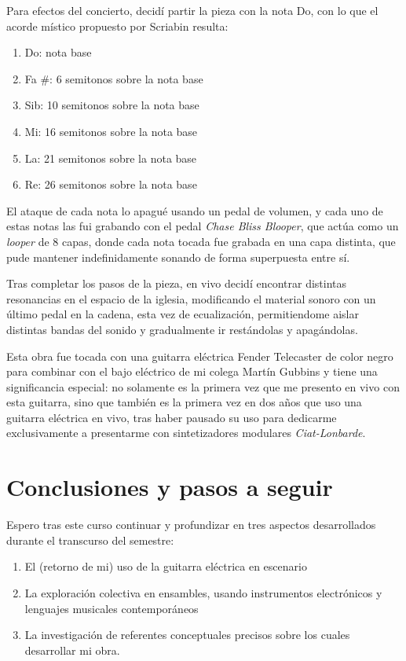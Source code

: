 \documentclass{article}
\begin{document}
Para efectos del concierto, decidí partir la pieza con la nota Do, con lo que el acorde místico propuesto por Scriabin resulta:

\begin{enumerate}
    \item Do: nota base
    \item Fa \#: 6 semitonos sobre la nota base
    \item Sib: 10 semitonos sobre la nota base
    \item Mi: 16 semitonos sobre la nota base
    \item La: 21 semitonos sobre la nota base
    \item Re: 26 semitonos sobre la nota base
\end{enumerate}

El ataque de cada nota lo apagué usando un pedal de volumen, y cada uno de estas notas las fui grabando con el pedal \textit{Chase Bliss Blooper}, que actúa como un \textit{looper} de 8 capas, donde cada nota tocada fue grabada en una capa distinta, que pude mantener indefinidamente sonando de forma superpuesta entre sí.

Tras completar los pasos de la pieza, en vivo decidí encontrar distintas resonancias en el espacio de la iglesia, modificando el material sonoro con un último pedal en la cadena, esta vez de ecualización, permitiendome aislar distintas bandas del sonido y gradualmente ir restándolas y apagándolas.

Esta obra fue tocada con una guitarra eléctrica Fender Telecaster de color negro para combinar con el bajo eléctrico de mi colega Martín Gubbins y tiene una significancia especial: no solamente es la primera vez que me presento en vivo con esta guitarra, sino que también es la primera vez en dos años que uso una guitarra eléctrica en vivo, tras haber pausado su uso para dedicarme exclusivamente a presentarme con sintetizadores modulares \textit{Ciat-Lonbarde}.

\clearpage

\section{Conclusiones y pasos a seguir}

Espero tras este curso continuar y profundizar en tres aspectos desarrollados durante el transcurso del semestre:

\begin{enumerate}
    \item El (retorno de mi) uso de la guitarra eléctrica en escenario
    \item La exploración colectiva en ensambles, usando instrumentos electrónicos y lenguajes musicales contemporáneos
    \item La investigación de referentes conceptuales precisos sobre los cuales desarrollar mi obra.
\end{enumerate}
\end{document}
